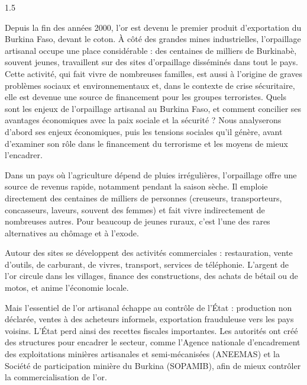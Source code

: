 \documentclass[12pt]{article}
\begin{document}
\begin{spacing}{1.5}


Depuis la fin des années 2000, l'or est devenu le premier produit d'exportation du Burkina Faso, devant le coton. À côté des grandes mines industrielles, l'orpaillage artisanal occupe une place considérable : des centaines de milliers de Burkinabè, souvent jeunes, travaillent sur des sites d'orpaillage disséminés dans tout le pays. Cette activité, qui fait vivre de nombreuses familles, est aussi à l'origine de graves problèmes sociaux et environnementaux et, dans le contexte de crise sécuritaire, elle est devenue une source de financement pour les groupes terroristes. Quels sont les enjeux de l'orpaillage artisanal au Burkina Faso, et comment concilier ses avantages économiques avec la paix sociale et la sécurité ? Nous analyserons d'abord ses enjeux économiques, puis les tensions sociales qu'il génère, avant d'examiner son rôle dans le financement du terrorisme et les moyens de mieux l'encadrer.


Dans un pays où l'agriculture dépend de pluies irrégulières, l'orpaillage offre une source de revenus rapide, notamment pendant la saison sèche. Il emploie directement des centaines de milliers de personnes (creuseurs, transporteurs, concasseurs, laveurs, souvent des femmes) et fait vivre indirectement de nombreuses autres. Pour beaucoup de jeunes ruraux, c'est l'une des rares alternatives au chômage et à l'exode.

Autour des sites se développent des activités commerciales : restauration, vente d'outils, de carburant, de vivres, transport, services de téléphonie. L'argent de l'or circule dans les villages, finance des constructions, des achats de bétail ou de motos, et anime l'économie locale.

Mais l'essentiel de l'or artisanal échappe au contrôle de l'État : production non déclarée, ventes à des acheteurs informels, exportation frauduleuse vers les pays voisins. L'État perd ainsi des recettes fiscales importantes. Les autorités ont créé des structures pour encadrer le secteur, comme l'Agence nationale d'encadrement des exploitations minières artisanales et semi-mécanisées (ANEEMAS) et la Société de participation minière du Burkina (SOPAMIB), afin de mieux contrôler la commercialisation de l'or.


\end{spacing}
\end{document}
